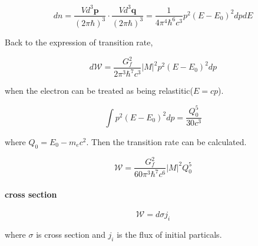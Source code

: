 \documentclass{article}
\begin{document}
			\begin{equation}
				dn = \frac{Vd^{3}\bm{p}}{(2\pi\hbar)^{3}}\cdot\frac{Vd^{3}\bm{q}}{(2\pi\hbar)^{3}} = \frac{1}{4\pi^{4}\hbar^{6}c^{3}}p^{2}(E - E_{0})^{2}dpdE
			\end{equation}

			Back to the expression of transition rate,

			\begin{equation}
				d\mathscr{W} = \frac{G_{f}^{2}}{2\pi^{3}\hbar^{7}c^{3}}|M|^{2}p^{2}(E - E_{0})^{2}dp
			\end{equation}

			when the electron can be treated as being relastitic($E = cp$).

			\begin{equation}
				\int p^{2}(E - E_{0})^{2}dp = \frac{Q_{0}^{5}}{30c^{3}}
			\end{equation}

			where $Q_{0} = E_{0} - m_{e}c^{2}$. Then the transition rate can be calculated.

			\begin{equation}
				\mathscr{W} = \frac{G_{f}^{2}}{60\pi^{3}\hbar^{7}c^{6}}|M|^{2}Q_{0}^{5}
			\end{equation}

		\paragraph{cross section}

			\begin{equation}
				\mathscr{W} = d\sigma j_{i}
			\end{equation}

			where $\sigma$ is cross section and $j_{i}$ is the flux of initial particals.
\end{document}
